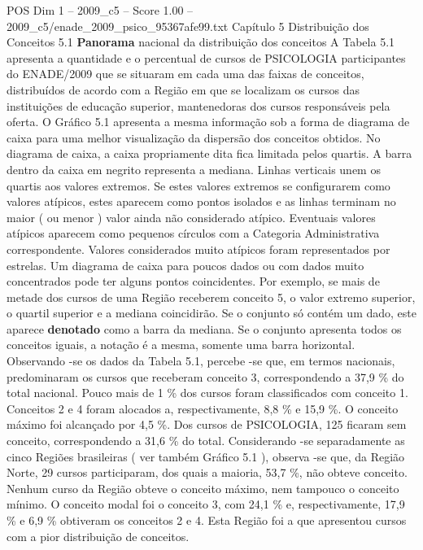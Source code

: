 \begin{textsample}{POS Dim 1 – 2009\_c5 – Score 1.00 – 2009\_c5/enade\_2009\_psico\_95367afe99.txt}  \label{ex:f1_pos_147}
Capítulo 5 Distribuição dos Conceitos 5.1 \textbf{Panorama} nacional da distribuição dos conceitos A Tabela 5.1 apresenta a quantidade e o percentual de cursos de PSICOLOGIA participantes do ENADE/2009 que se situaram em cada uma das faixas de conceitos, distribuídos de acordo com a Região em que se localizam os cursos das instituições de educação superior, mantenedoras dos cursos responsáveis pela oferta.
O Gráfico 5.1 apresenta a mesma informação sob a forma de diagrama de caixa para uma melhor visualização da dispersão dos conceitos obtidos.
No diagrama de caixa, a caixa propriamente dita fica limitada pelos quartis.
A barra dentro da caixa em negrito representa a mediana.
Linhas verticais unem os quartis aos valores extremos.
Se estes valores extremos se configurarem como valores atípicos, estes aparecem como pontos isolados e as linhas terminam no maior ( ou menor ) valor ainda não considerado atípico.
Eventuais valores atípicos aparecem como pequenos círculos com a Categoria Administrativa correspondente.
Valores considerados muito atípicos foram representados por estrelas.
Um diagrama de caixa para poucos dados ou com dados muito concentrados pode ter alguns pontos coincidentes.
Por exemplo, se mais de metade dos cursos de uma Região receberem conceito 5, o valor extremo superior, o quartil superior e a mediana coincidirão.
Se o conjunto só contém um dado, este aparece \textbf{denotado} como a barra da mediana.
Se o conjunto apresenta todos os conceitos iguais, a notação é a mesma, somente uma barra horizontal.
Observando -se os dados da Tabela 5.1, percebe -se que, em termos nacionais, predominaram os cursos que receberam conceito 3, correspondendo a 37,9 \% do total nacional.
Pouco mais de 1 \% dos cursos foram classificados com conceito 1.
Conceitos 2 e 4 foram alocados a, respectivamente, 8,8 \% e 15,9 \%.
O conceito máximo foi alcançado por 4,5 \%.
Dos cursos de PSICOLOGIA, 125 ficaram sem conceito, correspondendo a 31,6 \% do total.
Considerando -se separadamente as cinco Regiões brasileiras ( ver também Gráfico 5.1 ), observa -se que, da Região Norte, 29 cursos participaram, dos quais a maioria, 53,7 \%, não obteve conceito.
Nenhum curso da Região obteve o conceito máximo, nem tampouco o conceito mínimo.
O conceito modal foi o conceito 3, com 24,1 \% e, respectivamente, 17,9 \% e 6,9 \% obtiveram os conceitos 2 e 4.
Esta Região foi a que apresentou cursos com a pior distribuição de conceitos.

\end{textsample}
